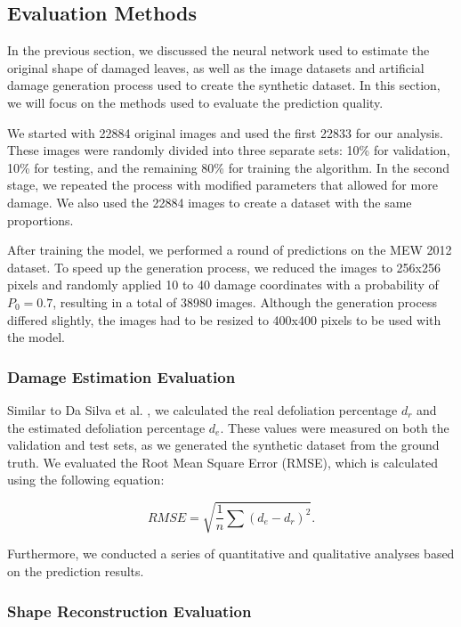\subsection{Evaluation Methods}

In the previous section, we discussed the neural network used to estimate the original shape of damaged leaves, as well as the image datasets and artificial damage generation process used to create the synthetic dataset. In this section, we will focus on the methods used to evaluate the prediction quality.

We started with 22884 original images and used the first 22833 for our analysis. These images were randomly divided into three separate sets: 10\% for validation, 10\% for testing, and the remaining 80\% for training the algorithm. In the second stage, we repeated the process with modified parameters that allowed for more damage. We also used the 22884 images to create a dataset with the same proportions.

After training the model, we performed a round of predictions on the MEW 2012 dataset. To speed up the generation process, we reduced the images to 256x256 pixels and randomly applied 10 to 40 damage coordinates with a probability of $P_0 = 0.7$, resulting in a total of 38980 images. Although the generation process differed slightly, the images had to be resized to 400x400 pixels to be used with the model.

\subsubsection{Damage Estimation Evaluation}

Similar to Da Silva et al. \cite{da2019estimating}, we calculated the real defoliation percentage $d_r$ and the estimated defoliation percentage $d_e$. These values were measured on both the validation and test sets, as we generated the synthetic dataset from the ground truth. We evaluated the Root Mean Square Error (RMSE), which is calculated using the following equation:

\begin{equation}
	\label{eq:RMSE}
	RMSE = \sqrt{\frac{1}{n} \sum (d_e - d_r)^2}.
\end{equation}

Furthermore, we conducted a series of quantitative and qualitative analyses based on the prediction results.

\subsubsection{Shape Reconstruction Evaluation}

